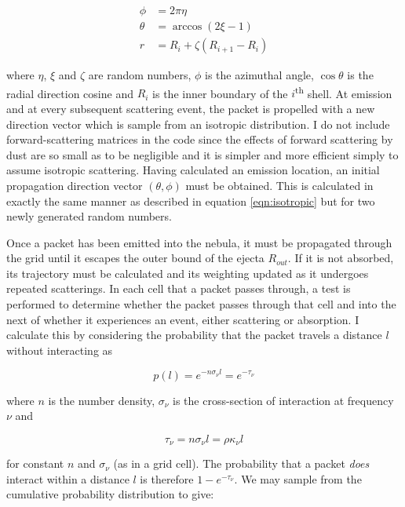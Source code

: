 	\begin{align}
		\phi&=2\pi\eta \\
		\theta&=\arccos(2\xi -1) \\
		r&=R_i+\zeta(R_{i+1}-R_i)
		\label{eqn:isotropic}
	\end{align}

\noindent where $\eta$, $\xi$ and $\zeta$ are random numbers, $\phi$ is the azimuthal angle, $\cos \theta$ is the radial direction cosine and $R_i$ is the inner boundary of the $i$\textsuperscript{th} shell.  At emission and at every subsequent scattering event, the packet is propelled with a new direction vector which is sample from an isotropic distribution.  I do not include forward-scattering matrices in the code since the effects of forward scattering by dust are so small as to be negligible and it is simpler and more efficient simply to assume isotropic scattering.  Having calculated an emission location, an initial propagation direction vector $(\theta,\phi)$ must be obtained.  This is calculated in exactly the same manner as described in equation \ref{eqn:isotropic} but for two newly generated random numbers.

Once a packet has been emitted into the nebula, it must be propagated through the grid until it escapes the outer bound of the ejecta $R_{out}$.  If it is not absorbed, its trajectory must be calculated and its weighting updated as it undergoes repeated scatterings.  In each cell that a packet passes through, a test is performed to determine whether the packet passes through that cell and into the next of whether it experiences an event, either scattering or absorption.  I calculate this by considering the probability that the packet travels a distance $l$ without interacting as 

\begin{equation}
p(l)=e ^{-n \sigma_{\nu} l}=e ^{-\tau_{\nu}} 
\end{equation}

\noindent where $n$ is the number density, $\sigma_{\nu}$ is the cross-section of interaction at frequency $\nu$ and 

\begin{equation}
 \tau_{\nu} = n\sigma_{\nu} l = \rho \kappa_{\nu}  l
 \end{equation}
 
 \noindent for constant $n$ and $\sigma_{\nu}$ (as in a grid cell).  The probability that a packet \textit{does} interact within a distance $l$ is therefore $1-e^{-\tau_{\nu}}$.  We may sample from the cumulative probability distribution to give: 

